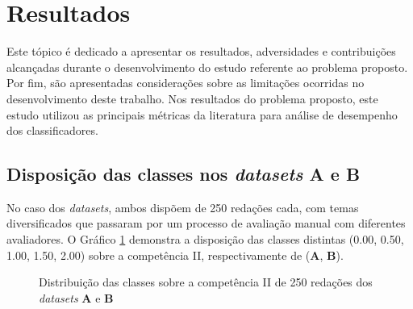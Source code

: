\section{Resultados}

Este tópico é dedicado a apresentar os resultados, adversidades e contribuições 
alcançadas durante o desenvolvimento do estudo referente ao problema proposto. 
Por fim, são apresentadas considerações sobre as limitações ocorridas no 
desenvolvimento deste trabalho. Nos resultados do problema proposto, este 
estudo utilizou as principais métricas da literatura para análise de desempenho 
dos classificadores.

\subsection{Disposição das classes nos \textit{datasets} \textbf{A} e \textbf{B}}

No caso dos \textit{datasets}, ambos dispõem de 250 redações cada, com temas 
diversificados que passaram por um processo de avaliação manual com diferentes 
avaliadores. O Gráfico \ref{graphic:class_dataset_balanced} demonstra a 
disposição das classes distintas (0.00, 0.50, 1.00, 1.50, 2.00) sobre a 
competência II, respectivamente de (\textbf{A}, \textbf{B}).

\begin{figure}[H]
    \begin{center}
    \caption{Distribuição das classes sobre a competência II de 250 redações dos 
    \textit{datasets} \textbf{A} e \textbf{B}}
    \label{graphic:class_dataset_balanced}
    \end{center}
\end{figure}

